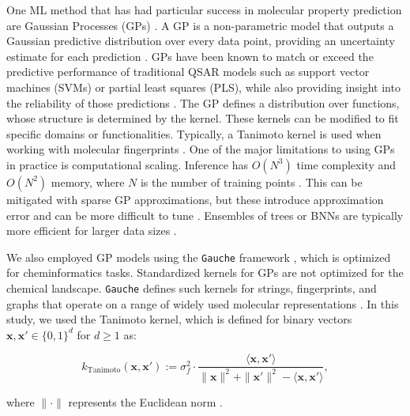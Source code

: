 \documentclass[pdflatex,sn-mathphys-num]{sn-jnl}%
\theoremstyle{thmstyleone}%
\theoremstyle{thmstyletwo}%
\theoremstyle{thmstylethree}%
\begin{document}
One ML method that has had particular success in molecular property prediction are Gaussian Processes (GPs) \citep{Obrezanova2007, gauche}. A GP is a non-parametric model that outputs a Gaussian predictive distribution over every data point, providing an uncertainty estimate for each prediction \citep{Obrezanova2007}. GPs have been known to match or exceed the predictive performance of traditional QSAR models such as support vector machines (SVMs) or partial least squares (PLS), while also providing insight into the reliability of those predictions \citep{Obrezanova2007}. The GP defines a distribution over functions, whose structure is determined by the kernel. These kernels can be modified to fit specific domains or functionalities. Typically, a Tanimoto kernel is used when working with molecular fingerprints \citep{Ralaivola2005, moss2020, gauche}. One of the major limitations to using GPs in practice is computational scaling. Inference has $O(N^3)$ time complexity and $O(N^2)$ memory, where $N$ is the number of training points \citep{Rasmussen2005}. This can be mitigated with sparse GP approximations, but these introduce approximation error and can be more difficult to tune \citep{quinonero2005}. Ensembles of trees or BNNs are typically more efficient for larger data sizes \citep{lakshminarayanan2017}.

We also employed GP models using the \texttt{Gauche} framework \citep{gauche}, which is optimized for cheminformatics tasks. Standardized kernels for GPs are not optimized for the chemical landscape. \texttt{Gauche} defines such kernels for strings, fingerprints, and graphs that operate on a range of widely used molecular representations \citep{gauche}. In this study, we used the Tanimoto kernel, which is defined for binary vectors $\mathbf{x}, \mathbf{x}' \in \{0, 1\}^d$ for $d \geq 1$ as:

$$
k_{\text{Tanimoto}}(\mathbf{x}, \mathbf{x}') := \sigma_f^2 \cdot \frac{\langle \mathbf{x}, \mathbf{x}' \rangle}{\|\mathbf{x}\|^2 + \|\mathbf{x}'\|^2 - \langle \mathbf{x}, \mathbf{x}' \rangle},
$$

where $\|\cdot\|$ represents the Euclidean norm \citep{gauche}. 
\end{document}
